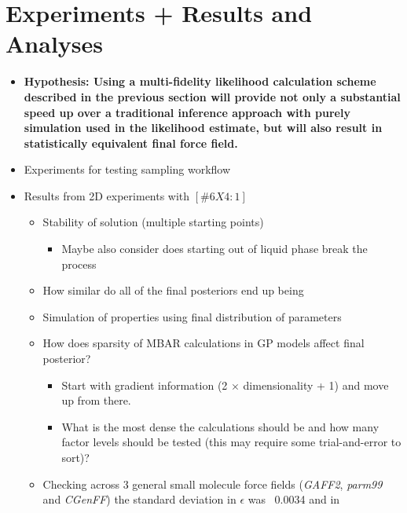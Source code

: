 \documentclass[aps,pre,nofootinbib,superscriptaddress,linenumbers,10pt, draft,tightenlines]{revtex4-1}
\begin{document}
\section{Experiments + Results and Analyses}
\begin{itemize}
	\item \textbf{Hypothesis: Using a multi-fidelity likelihood calculation scheme described in the previous section will provide not only a substantial
	      speed up over a traditional inference approach with purely simulation used in the likelihood estimate, but 
	      will also result in statistically equivalent final force field.}
	\item Experiments for testing sampling workflow
        \item Results from 2D experiments with $[\#6X4:1]$
        \begin{itemize}
            \item Stability of solution (multiple starting points) %
            \begin{itemize}
                \item Maybe also consider does starting out of liquid phase break the process 
            \end{itemize}
            \item How similar do all of the final posteriors end up being %
            \item Simulation of properties using final distribution of parameters
            \item How does sparsity of MBAR calculations in GP models affect final posterior?
            \begin{itemize}
                \item Start with gradient information (2 $\times$ dimensionality + 1) and move up
                      from there. %
                \item What is the most dense the calculations should be and how many factor
                      levels should be tested (this may require some trial-and-error to sort)?
            \end{itemize}
            \item Checking across 3 general small molecule force fields (\textit{GAFF2},
                  \textit{parm99} and \textit{CGenFF}) the standard 
                  deviation in $\epsilon$ was ~0.0034 and in

\end{itemize}
\end{itemize}
\end{document}

